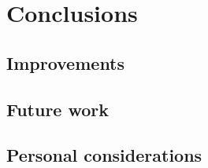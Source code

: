 
\chapter{Conclusions}\label{ch:conclusions}

	\section{Improvements}

	\section{Future work}

	\section{Personal considerations}
